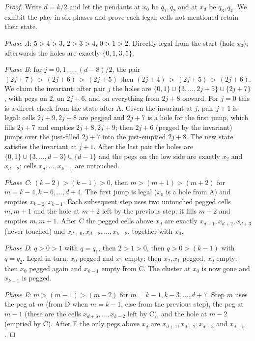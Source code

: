 \documentclass[11pt]{article}
\theoremstyle{definition}
\begin{document}
\begin{proof}
Write $d=k/2$ and let the pendants at $x_0$ be $q_1,q_2$ and at
$x_d$ be $q_3,q_4$. We exhibit the play in six phases and prove each
legal; cells not mentioned retain their state.

\emph{Phase A}: $5{>}4{>}3$, $2{>}3{>}4$, $0{>}1{>}2$. Directly
legal from the start (hole $x_3$); afterwards the holes are exactly
$\{0,1,3,5\}$.

\emph{Phase B}: for $j=0,1,\dots,(d-8)/2$, the pair
$(2j{+}7)\,{>}\,(2j{+}6)\,{>}\,(2j{+}5)$ then
$(2j{+}4)\,{>}\,(2j{+}5)\,{>}\,(2j{+}6)$. We claim the invariant:
after pair $j$ the holes are $\{0,1\}\cup\{3,\dots,2j{+}5\}\cup
\{2j{+}7\}$, with pegs on $2$, on $2j{+}6$, and on everything from
$2j{+}8$ onward. For $j=0$ this is a direct check from the state
after A. Given the invariant at $j$, pair $j{+}1$ is legal: cells
$2j{+}9,2j{+}8$ are pegged and $2j{+}7$ is a hole for the first
jump, which fills $2j{+}7$ and empties $2j{+}8,2j{+}9$; then
$2j{+}6$ (pegged by the invariant) jumps over the just-filled
$2j{+}7$ into the just-emptied $2j{+}8$. The new state satisfies the
invariant at $j{+}1$. After the last pair the holes are
$\{0,1\}\cup\{3,\dots,d{-}3\}\cup\{d{-}1\}$ and the pegs on the low
side are exactly $x_2$ and $x_{d-2}$; cells $x_d,\dots,x_{k-1}$ are
untouched.

\emph{Phase C}: $(k{-}2){>}(k{-}1){>}0$, then
$m{>}(m{+}1){>}(m{+}2)$ for $m=k{-}4,k{-}6,\dots,d{+}4$. The first
jump is legal ($x_0$ is a hole from A) and empties
$x_{k-2},x_{k-1}$. Each subsequent step uses two untouched pegged
cells $m,m{+}1$ and the hole at $m{+}2$ left by the previous step;
it fills $m{+}2$ and empties $m,m{+}1$. After C the pegged cells
above $x_d$ are exactly $x_{d+1},x_{d+2},x_{d+3}$ (never touched)
and $x_{d+6},x_{d+8},\dots,x_{k-2}$, together with $x_0$.

\emph{Phase D}: $q{>}0{>}1$ with $q=q_1$, then $2{>}1{>}0$, then
$q{>}0{>}(k{-}1)$ with $q=q_2$. Legal in turn: $x_0$ pegged and
$x_1$ empty; then $x_2,x_1$ pegged, $x_0$ empty; then $x_0$ pegged
again and $x_{k-1}$ empty from C. The cluster at $x_0$ is now gone
and $x_{k-1}$ is pegged.

\emph{Phase E}: $m{>}(m{-}1){>}(m{-}2)$ for
$m=k{-}1,k{-}3,\dots,d{+}7$. Step $m$ uses the peg at $m$ (from D
when $m=k{-}1$, else from the previous step), the peg at $m{-}1$
(these are the cells $x_{d+6},\dots,x_{k-2}$ left by C), and the
hole at $m{-}2$ (emptied by C). After E the only pegs above $x_d$
are $x_{d+1},x_{d+2},x_{d+3}$ and $x_{d+5}$.


\end{proof}
\end{document}
